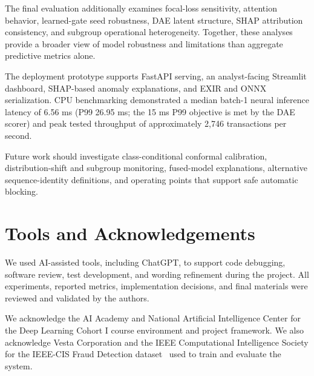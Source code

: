 \documentclass[conference]{IEEEtran}
\begin{document}
The final evaluation additionally examines focal-loss sensitivity, attention
behavior, learned-gate seed robustness, DAE latent structure, SHAP attribution
consistency, and subgroup operational heterogeneity. Together, these analyses
provide a broader view of model robustness and limitations than aggregate
predictive metrics alone.

The deployment prototype supports FastAPI serving, an analyst-facing Streamlit
dashboard, SHAP-based anomaly explanations, and EXIR and ONNX serialization.
CPU benchmarking demonstrated a median batch-1 neural inference latency of
6.56 ms (P99 26.95 ms; the 15 ms P99 objective is met by the DAE scorer) and
peak tested throughput of approximately 2,746 transactions per second.

Future work should investigate class-conditional conformal calibration,
distribution-shift and subgroup monitoring, fused-model explanations,
alternative sequence-identity definitions, and operating points that support
safe automatic blocking.

\section*{Tools and Acknowledgements}

We used AI-assisted tools, including ChatGPT, to support code debugging,
software review, test development, and wording refinement during the project.
All experiments, reported metrics, implementation decisions, and final
materials were reviewed and validated by the authors.

We acknowledge the AI Academy and National Artificial Intelligence Center for
the Deep Learning Cohort I course environment and project framework. We also
acknowledge Vesta Corporation and the IEEE Computational Intelligence Society
for the IEEE-CIS Fraud Detection dataset~\cite{ieeecis2019} used to train and
evaluate the system.
\end{document}

